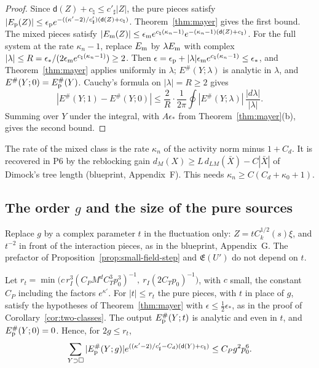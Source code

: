 \begin{proof}
Since $\mathsf d(Z)+c_\natural\le c'_\sharp|Z|$, the pure pieces satisfy $|E_{\rm p}(Z)|\le\epsilon_{\rm p}e^{-((\kappa'-2)/c'_\sharp)(\mathsf d(Z)+c_\natural)}$. Theorem~\ref{thm:mayer} gives the first bound. The mixed pieces satisfy $|E_{\rm m}(Z)|\le\epsilon_{\rm m}e^{c_\natural(\kappa_n-1)}e^{-(\kappa_n-1)(\mathsf d(Z)+c_\natural)}$. For the full system at the rate $\kappa_n-1$, replace $E_{\rm m}$ by $\lambda E_{\rm m}$ with complex $|\lambda|\le R=\epsilon_*/(2\epsilon_{\rm m}e^{c_\natural(\kappa_n-1)})\ge2$. Then $\epsilon=\epsilon_{\rm p}+|\lambda|\epsilon_{\rm m}e^{c_\natural(\kappa_n-1)}\le\epsilon_*$, and Theorem~\ref{thm:mayer} applies uniformly in $\lambda$; $E^\#(Y;\lambda)$ is analytic in $\lambda$, and $E^\#(Y;0)=E^\#_{\rm p}(Y)$. Cauchy's formula on $|\lambda|=R\ge2$ gives
\[
|E^\#(Y;1)-E^\#(Y;0)|\le\frac2R\cdot\frac1{2\pi}\oint|E^\#(Y;\lambda)|\,\frac{|d\lambda|}{|\lambda|}.
\]
Summing over $Y$ under the integral, with $A\epsilon_*$ from Theorem~\ref{thm:mayer}(b), gives the second bound.
\end{proof}

The rate of the mixed class is the rate $\kappa_n$ of the activity norm minus $1+C_d$. It is recovered in P6 by the reblocking gain $d_M(X)\ge L\,d_{LM}(\bar X)-C|\bar X|$ of Dimock's tree length (blueprint, Appendix~F). This needs $\kappa_n\ge C(C_d+\kappa_0+1)$.

\subsection{\texorpdfstring{The order $g$ and the size of the pure sources}{The order g and the size of the pure sources}}\label{subsec:cl-order}

Replace $g$ by a complex parameter $t$ in the fluctuation only: $Z=tC_k^{1/2}(s)\xi$, and $t^{-2}$ in front of the interaction pieces, as in the blueprint, Appendix~G. The prefactor of Proposition~\ref{prop:small-field-step} and $\mathfrak E(U')$ do not depend on $t$.

\begin{proposition}\label{prop:pure-sources}
Let $r_t=\min\big(c\,r_I^3(C_PM^dC_T^3p_0^3)^{-1},\ r_I(2C_Tp_0)^{-1}\big)$, with $c$ small, the constant $C_P$ including the factors $e^{\kappa'}$. For $|t|\le r_t$ the pure pieces, with $t$ in place of $g$, satisfy the hypotheses of Theorem~\ref{thm:mayer} with $\epsilon\le\frac12\epsilon_*$, as in the proof of Corollary~\ref{cor:two-classes}. The output $E^\#_{\rm p}(Y;t)$ is analytic and even in $t$, and $E^\#_{\rm p}(Y;0)=0$. Hence, for $2g\le r_t$,
\[
\sum_{Y\supset\Box}|E^\#_{\rm p}(Y;g)|e^{((\kappa'-2)/c'_\sharp-C_d)(\mathsf d(Y)+c_\natural)}\le C_Pg^2p_0^6 .
\]
\end{proposition}

